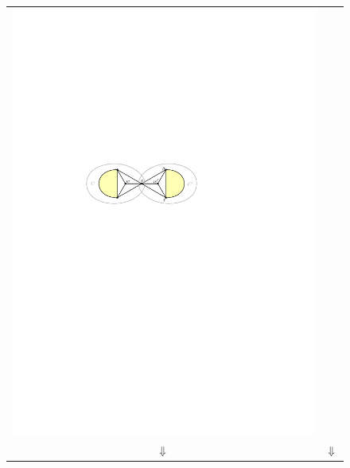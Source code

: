 \documentclass[a4paper,UKenglish,cleveref, autoref, thm-restate]{lipics-v2021}
\begin{document}
\begin{figure}[htpb]
\begin{tabular}{cc}
    \includegraphics[page=3]{figs/isolated} \\
    $\Downarrow$ & $\Downarrow$ \\

\end{tabular}
\end{figure}
\end{document}
